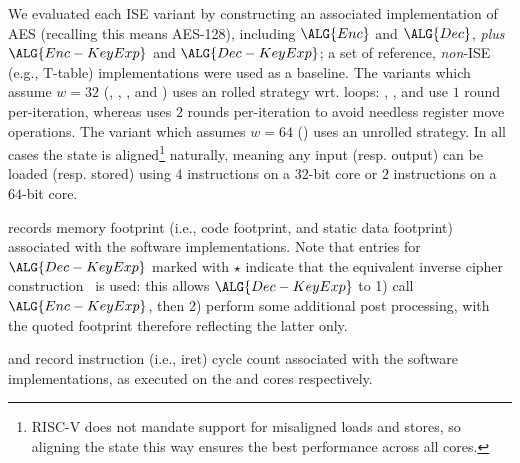 
We evaluated each ISE variant by constructing an associated implementation
of AES (recalling this means AES-128), including
$\ALG{Enc}$
and
$\ALG{Dec}$,
{\em plus}
$\ALG{Enc-KeyExp}$
and
$\ALG{Dec-KeyExp}$;
a set of reference, {\em non}-ISE 
(e.g., T-table) 
implementations were used as a baseline.
The variants which assume  $w = 32$
(, ,     , and )
uses an   rolled strategy wrt. loops:
 , ,              and 
use  $1$ round  per-iteration,
whereas
uses $2$ rounds per-iteration
to avoid needless register move operations.
The variant  which assumes $w = 64$
()
uses an unrolled strategy.
In all cases the state is aligned\footnote{%
RISC-V does not mandate support for misaligned loads and stores, so
aligning the state this way ensures the best performance across all
cores.
} naturally, meaning any input (resp. output) can be loaded (resp. stored) 
using 
$4$  instructions on a $32$-bit core
or
$2$  instructions on a $64$-bit core.

records
memory footprint (i.e., code footprint, and static data footprint)
associated with the software implementations.
Note that entries for $\ALG{Dec-KeyExp}$ marked with $\star$ indicate that 
the equivalent inverse cipher construction~ \cite[Section 5.3.5]{FIPS:197}
is used: this allows $\ALG{Dec-KeyExp}$ to
1) call $\ALG{Enc-KeyExp}$,
   then
2) perform some additional post processing,
with the quoted footprint therefore reflecting the latter only.  

and
record
instruction (i.e., iret) cycle count
associated with the software implementations,
as executed on the  and  cores respectively.

